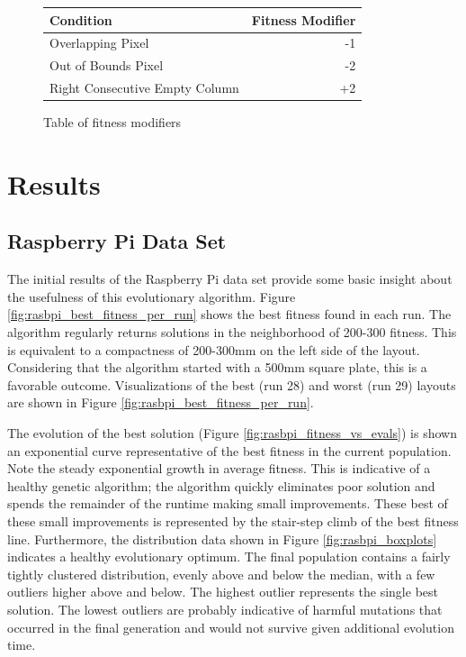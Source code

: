 \documentclass[conference]{IEEEtran}
\begin{document}
\begin{figure}
\centering
\begin{tabular}{ |l|r| } 
  \hline
  Condition & Fitness Modifier\\ 
  \hline
  Overlapping Pixel & -1\\ 
  Out of Bounds Pixel & -2\\
  Right Consecutive Empty Column & +2\\
 \hline
\end{tabular}
\caption{Table of fitness modifiers}
\label{fig:fitness_mod_table}
\end{figure}

\section{Results}\label{results}
\subsection{Raspberry Pi Data Set}\label{rasbpi_dataset}
The initial results of the Raspberry Pi data set provide some basic insight about the usefulness of this evolutionary algorithm. Figure \ref{fig:rasbpi_best_fitness_per_run} shows the best fitness found in each run. The algorithm regularly returns solutions in the neighborhood of 200-300 fitness. This is equivalent to a compactness of 200-300mm on the left side of the layout. Considering that the algorithm started with a 500mm square plate, this is a favorable outcome. Visualizations of the best (run 28) and worst (run 29) layouts are shown in Figure \ref{fig:rasbpi_best_fitness_per_run}.

The evolution of the best solution (Figure \ref{fig:rasbpi_fitness_vs_evals}) is shown an exponential curve representative of the best fitness in the current population. Note the steady exponential growth in average fitness. This is indicative of a healthy genetic algorithm; the algorithm quickly eliminates poor solution and spends the remainder of the runtime making small improvements. These best of these small improvements is represented by the stair-step climb of the best fitness line. Furthermore, the distribution data shown in Figure \ref{fig:rasbpi_boxplots} indicates a healthy evolutionary optimum. The final population contains a fairly tightly clustered distribution, evenly above and below the median, with a few outliers higher above and below. The highest outlier represents the single best solution. The lowest outliers are probably indicative of harmful mutations that occurred in the final generation and would not survive given additional evolution time.
\end{document}
